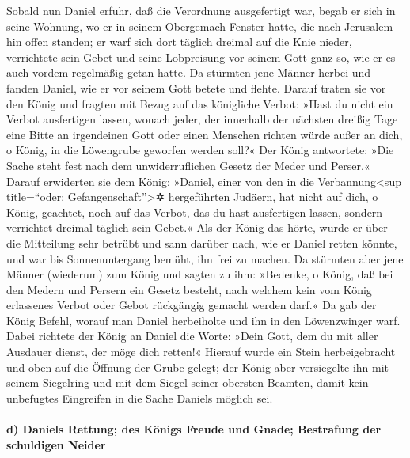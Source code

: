 Sobald nun Daniel erfuhr, daß die Verordnung ausgefertigt
war, begab er sich in seine Wohnung, wo er in seinem Obergemach Fenster
hatte, die nach Jerusalem hin offen standen; er warf sich dort täglich
dreimal auf die Knie nieder, verrichtete sein Gebet und seine
Lobpreisung vor seinem Gott ganz so, wie er es auch vordem regelmäßig
getan hatte. Da stürmten jene Männer herbei und fanden
Daniel, wie er vor seinem Gott betete und flehte. Darauf
traten sie vor den König und fragten mit Bezug auf das königliche
Verbot: »Hast du nicht ein Verbot ausfertigen lassen, wonach jeder, der
innerhalb der nächsten dreißig Tage eine Bitte an irgendeinen Gott oder
einen Menschen richten würde außer an dich, o König, in die Löwengrube
geworfen werden soll?« Der König antwortete: »Die Sache steht fest nach
dem unwiderruflichen Gesetz der Meder und Perser.« Darauf
erwiderten sie dem König: »Daniel, einer von den in die
Verbannung\textless sup title=``oder: Gefangenschaft''\textgreater✲
hergeführten Judäern, hat nicht auf dich, o König, geachtet, noch auf
das Verbot, das du hast ausfertigen lassen, sondern verrichtet dreimal
täglich sein Gebet.« Als der König das hörte, wurde er
über die Mitteilung sehr betrübt und sann darüber nach, wie er Daniel
retten könnte, und war bis Sonnenuntergang bemüht, ihn frei zu machen.
Da stürmten aber jene Männer (wiederum) zum König und
sagten zu ihm: »Bedenke, o König, daß bei den Medern und Persern ein
Gesetz besteht, nach welchem kein vom König erlassenes Verbot oder Gebot
rückgängig gemacht werden darf.« Da gab der König Befehl,
worauf man Daniel herbeiholte und ihn in den Löwenzwinger warf. Dabei
richtete der König an Daniel die Worte: »Dein Gott, dem du mit aller
Ausdauer dienst, der möge dich retten!« Hierauf wurde ein
Stein herbeigebracht und oben auf die Öffnung der Grube gelegt; der
König aber versiegelte ihn mit seinem Siegelring und mit dem Siegel
seiner obersten Beamten, damit kein unbefugtes Eingreifen in die Sache
Daniels möglich sei.

\hypertarget{d-daniels-rettung-des-kuxf6nigs-freude-und-gnade-bestrafung-der-schuldigen-neider}{%
\paragraph{d) Daniels Rettung; des Königs Freude und Gnade; Bestrafung
der schuldigen
Neider}\label{d-daniels-rettung-des-kuxf6nigs-freude-und-gnade-bestrafung-der-schuldigen-neider}}

